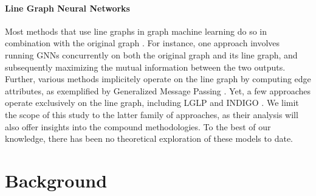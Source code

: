 \documentclass{article}
\begin{document}
\paragraph{Line Graph Neural Networks}
Most methods that use line graphs in graph machine learning do so in combination with the original graph \cite{choudhary2021atomistic,chen2017supervised,jiang2019censnet,zhang2023line}. For instance, one approach \cite{zhang2023line} involves running GNNs concurrently on both the original graph and its line graph, and subsequently maximizing the mutual information between the two outputs.
Further, various methods implicitely operate on the line graph by computing edge attributes, 
as exemplified by Generalized Message Passing \cite{battaglia2018relational}.
Yet, a few approaches operate exclusively on the line graph, including LGLP \cite{cai2021line} and INDIGO \cite{liu2021indigo}.
We limit the scope of this study to the latter family of approaches, as their analysis will also offer insights into the compound methodologies. To the best of our knowledge, there has been no theoretical exploration of these models to date.



\section{Background}    \label{sec:background}
\end{document}
